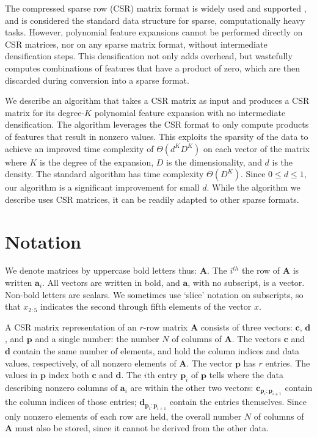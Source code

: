 \documentclass[journal]{journal}
\begin{document}
The compressed sparse row (CSR) matrix format \cite{saad1994sparskit} is widely used \cite{liu2012sparse, bulucc2009parallel, bell2008efficient, white1997improving} and supported \cite{eigenweb, bastien2012theano, scikit-learn, koenker2003sparsem}, and is considered the standard data structure for sparse, computationally heavy tasks.
However, polynomial feature expansions cannot be performed directly on CSR matrices, nor on any sparse matrix format, without intermediate densification steps.
This densification not only adds overhead, but wastefully computes combinations of features that have a product of zero, which are then discarded during conversion into a sparse format.

We describe an algorithm that takes a CSR matrix as input and produces a CSR matrix for its degree-$K$ polynomial feature expansion with no intermediate densification.
The algorithm leverages the CSR format to only compute products of features that result in nonzero values.
This exploits the sparsity of the data to achieve an improved time complexity of $\Theta(d^KD^K)$ on each vector of the matrix where $K$ is the degree of the expansion, $D$ is the dimensionality, and $d$ is the density.
The standard algorithm has time complexity $\Theta(D^K)$.
Since $0 \le d \le 1$, our algorithm is a significant improvement for small $d$.
While the algorithm we describe uses CSR matrices, it can be readily adapted to other sparse formats.

\section{Notation}
We denote matrices by uppercase bold letters thus: $\bm{A}$. 
The $i^{th}$ the row of $\bm{A}$ is written $\bm{a}_i$. All vectors are written in bold, and  $\bm{a}$, with no subscript, is a vector. Non-bold letters are scalars. We sometimes use `slice' notation on subscripts, so that $x_{2:5}$ indicates the second through fifth elements of the vector $x$.

A CSR matrix representation of an $r$-row matrix $\bm{A}$ consists of three vectors: $\bm{c}$, $\bm{d}$, and $\bm{p}$ and a single number: the number $N$ of columns of $\bm{A}$. The vectors
$\bm{c}$ and $\bm{d}$ contain the same number of elements, and hold the column indices and data values, respectively, of all nonzero elements of $\bm{A}$.
The vector $\bm{p}$ has $r$ entries. The values in $\bm{p}$ index both $\bm{c}$ and $\bm{d}$. The $i$th entry $\bm{p}_i$ of $\bm{p}$ tells where
the data describing nonzero columns of $\bm{a}_i$ are within the other two vectors: $\bm{c}_{\bm{p}_i:\bm{p}_{i+1}}$ contain the column indices of those entries; $\bm{d}_{\bm{p}_i:\bm{p}_{i+1}}$ contain the entries themselves.
Since only nonzero elements of each row are held, the overall number $N$ of columns of $\bm{A}$  must also be stored, since it cannot be derived
from the other data.
\end{document}
